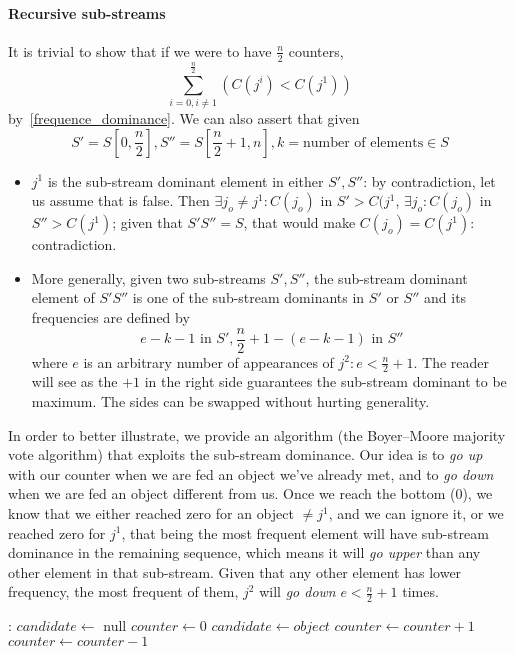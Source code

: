 \paragraph{Recursive sub-streams} It is trivial to show that if we were to have $\frac{n}{2}$ counters,
\begin{equation*}
\sum^{\frac{n}{2}}_{i = 0, i \neq 1}\left( C(j^{i}) < C(j^{1}) \right)
\end{equation*}
by~\ref{frequence_dominance}.
We can also assert that given
\begin{equation*}
  S' = S[0, \frac{n}{2}], S'' = S[\frac{n}{2} + 1, n], k = \text{number of elements} \in S
\end{equation*}
    \begin{itemize}
    \item \textbf{$j^{1}$} is the sub-stream dominant element in either $S', S''$: by contradiction, let us assume that is false.
    Then $\exists j_{o} \neq j^{1}: C(j_{o})$ in $S' > C(j^{1}$, $\exists j_{o}: C(j_{o})$ in $S'' > C(j^{1})$; given that $S'S'' = S$, that would make $C(j_{o}) = C(j^{1})$: contradiction.
    \item More generally, given two sub-streams $S', S''$, the sub-stream dominant element of $S'S''$ is one of the sub-stream dominants in $S'$ or $S''$ and its frequencies are defined by $$e - k - 1\textrm{ in } S', \frac{n}{2} + 1 - (e - k - 1) \textrm{ in } S''$$ where $e$ is an arbitrary number of appearances of $j^{2}: e < \frac{n}{2} + 1$.
    The reader will see as the $+1$ in the right side guarantees the sub-stream dominant to be maximum.
    The sides can be swapped without hurting generality.
    \end{itemize}

In order to better illustrate, we provide an algorithm (the Boyer–Moore majority vote algorithm) that exploits the sub-stream dominance.
Our idea is to \emph{go up} with our counter when we are fed an object we've already met, and to \emph{go down} when we are fed an object different from us.
Once we reach the bottom (0), we know that we either reached zero for an object $\neq j^{1}$, and we can ignore it, or we reached zero for $j^{1}$, that being the most frequent element will have sub-stream dominance in the remaining sequence, which means it will \emph{go upper} than any other element in that sub-stream.
Given that any other element has lower frequency, the most frequent of them, $j^{2}$ will \emph{go down} $e < \frac{n}{2} + 1$ times.

\begin{algorithmic}[1]
  :
    \State $candidate \gets$ null
    \State $counter \gets 0$
         \State $candidate \gets object$ 
         \State $counter \gets counter + 1$
         \State $counter \gets counter - 1$
       \EndIf
    \EndFor
    \State {}
  \EndFunction
\end{algorithmic}